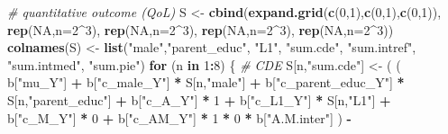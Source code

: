 \documentclass[
]{book}
\newenvironment{Shaded}{\begin{snugshade}}{\end{snugshade}}
\newcommand{\AttributeTok}[1]{\textcolor[rgb]{0.13,0.29,0.53}{#1}}
\newcommand{\CommentTok}[1]{\textcolor[rgb]{0.56,0.35,0.01}{\textit{#1}}}
\newcommand{\ConstantTok}[1]{\textcolor[rgb]{0.56,0.35,0.01}{#1}}
\newcommand{\ControlFlowTok}[1]{\textcolor[rgb]{0.13,0.29,0.53}{\textbf{#1}}}
\newcommand{\DecValTok}[1]{\textcolor[rgb]{0.00,0.00,0.81}{#1}}
\newcommand{\FunctionTok}[1]{\textcolor[rgb]{0.13,0.29,0.53}{\textbf{#1}}}
\newcommand{\NormalTok}[1]{#1}
\newcommand{\OtherTok}[1]{\textcolor[rgb]{0.56,0.35,0.01}{#1}}
\newcommand{\SpecialCharTok}[1]{\textcolor[rgb]{0.81,0.36,0.00}{\textbf{#1}}}
\newcommand{\StringTok}[1]{\textcolor[rgb]{0.31,0.60,0.02}{#1}}
\begin{document}
\begin{Shaded}
\begin{Highlighting}[]
  \CommentTok{\# quantitative outcome (QoL)}
\NormalTok{  S }\OtherTok{\textless{}{-}} \FunctionTok{cbind}\NormalTok{(}\FunctionTok{expand.grid}\NormalTok{(}\FunctionTok{c}\NormalTok{(}\DecValTok{0}\NormalTok{,}\DecValTok{1}\NormalTok{),}\FunctionTok{c}\NormalTok{(}\DecValTok{0}\NormalTok{,}\DecValTok{1}\NormalTok{),}\FunctionTok{c}\NormalTok{(}\DecValTok{0}\NormalTok{,}\DecValTok{1}\NormalTok{)), }\FunctionTok{rep}\NormalTok{(}\ConstantTok{NA}\NormalTok{,}\AttributeTok{n=}\DecValTok{2}\SpecialCharTok{\^{}}\DecValTok{3}\NormalTok{), }\FunctionTok{rep}\NormalTok{(}\ConstantTok{NA}\NormalTok{,}\AttributeTok{n=}\DecValTok{2}\SpecialCharTok{\^{}}\DecValTok{3}\NormalTok{), }
             \FunctionTok{rep}\NormalTok{(}\ConstantTok{NA}\NormalTok{,}\AttributeTok{n=}\DecValTok{2}\SpecialCharTok{\^{}}\DecValTok{3}\NormalTok{), }\FunctionTok{rep}\NormalTok{(}\ConstantTok{NA}\NormalTok{,}\AttributeTok{n=}\DecValTok{2}\SpecialCharTok{\^{}}\DecValTok{3}\NormalTok{))}
  \FunctionTok{colnames}\NormalTok{(S) }\OtherTok{\textless{}{-}} \FunctionTok{list}\NormalTok{(}\StringTok{"male"}\NormalTok{,}\StringTok{"parent\_educ"}\NormalTok{, }\StringTok{"L1"}\NormalTok{, }\StringTok{"sum.cde"}\NormalTok{, }\StringTok{"sum.intref"}\NormalTok{, }
                      \StringTok{"sum.intmed"}\NormalTok{, }\StringTok{"sum.pie"}\NormalTok{)}
  \ControlFlowTok{for}\NormalTok{ (n }\ControlFlowTok{in} \DecValTok{1}\SpecialCharTok{:}\DecValTok{8}\NormalTok{) \{}
    \CommentTok{\# CDE }
\NormalTok{    S[n,}\StringTok{"sum.cde"}\NormalTok{] }\OtherTok{\textless{}{-}}\NormalTok{ ( ( b[}\StringTok{"mu\_Y"}\NormalTok{] }\SpecialCharTok{+} 
\NormalTok{                            b[}\StringTok{"c\_male\_Y"}\NormalTok{] }\SpecialCharTok{*}\NormalTok{ S[n,}\StringTok{"male"}\NormalTok{] }\SpecialCharTok{+} 
\NormalTok{                            b[}\StringTok{"c\_parent\_educ\_Y"}\NormalTok{] }\SpecialCharTok{*}\NormalTok{ S[n,}\StringTok{"parent\_educ"}\NormalTok{] }\SpecialCharTok{+} 
\NormalTok{                            b[}\StringTok{"c\_A\_Y"}\NormalTok{] }\SpecialCharTok{*} \DecValTok{1} \SpecialCharTok{+} 
\NormalTok{                            b[}\StringTok{"c\_L1\_Y"}\NormalTok{] }\SpecialCharTok{*}\NormalTok{ S[n,}\StringTok{"L1"}\NormalTok{] }\SpecialCharTok{+}
\NormalTok{                            b[}\StringTok{"c\_M\_Y"}\NormalTok{] }\SpecialCharTok{*} \DecValTok{0} \SpecialCharTok{+}
\NormalTok{                            b[}\StringTok{"c\_AM\_Y"}\NormalTok{] }\SpecialCharTok{*} \DecValTok{1} \SpecialCharTok{*} \DecValTok{0} \SpecialCharTok{*}\NormalTok{ b[}\StringTok{"A.M.inter"}\NormalTok{] ) }\SpecialCharTok{{-}} 

\end{Highlighting}
\end{Shaded}
\end{document}
